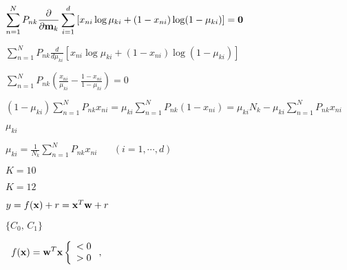 \documentclass{article}
\def\lthtmlcheckvsize{\ifdim\ht\sizebox<\vsize 
  \ifdim\wd\sizebox<\hsize\expandafter\hfill\fi \expandafter\vfill
  \else\expandafter\vss\fi}%
\begin{document}
{\newpage\clearpage
{}%
$\displaystyle \sum_{n=1}^N P_{nk} \frac{\partial}{\partial{\bf m}_k}
\sum_{i=1}^d\left[ x_{ni}\log\mu_{ki}+(1-x_{ni})\log(1-\mu_{ki}) \right]={\bf0}$%
\lthtmlindisplaymathZ
\lthtmlcheckvsize\clearpage}

{\newpage\clearpage
{}%
$\displaystyle \sum_{n=1}^N P_{nk}\frac{d}{d\mu_{ki}}
\left[ x_{ni}\log \mu_{ki}+(1-x_{ni})\log(1-\mu_{ki})\right]$%
\lthtmlindisplaymathZ
\lthtmlcheckvsize\clearpage}

{\newpage\clearpage
{}%
$\displaystyle \sum_{n=1}^N P_{nk}\left(\frac{x_{ni}}{\mu_{ki}}-\frac{1-x_{ni}}{1-\mu_{ki}}\right)=0$%
\lthtmlindisplaymathZ
\lthtmlcheckvsize\clearpage}

{\newpage\clearpage
{}%
$\displaystyle (1-\mu_{ki})\sum_{n=1}^N P_{nk} x_{ni}=\mu_{ki}\sum_{n=1}^N P_{nk}(1-x_{ni})
=\mu_{ki}N_k-\mu_{ki} \sum_{n=1}^N P_{nk}x_{ni}$%
\lthtmlindisplaymathZ
\lthtmlcheckvsize\clearpage}

{\newpage\clearpage
{}%
$ \mu_{ki}$%
\lthtmlindisplaymathZ
\lthtmlcheckvsize\clearpage}

{\newpage\clearpage
{}%
$\displaystyle \mu_{ki}=\frac{1}{N_k}\sum_{n=1}^N P_{nk}x_{ni}\;\;\;\;\;\;(i=1,\cdots,d)$%
\lthtmlindisplaymathZ
\lthtmlcheckvsize\clearpage}

{\newpage\clearpage
{}%
$ K=10$%
\lthtmlindisplaymathZ
\lthtmlcheckvsize\clearpage}

{\newpage\clearpage
{}%
$ K=12$%
\lthtmlindisplaymathZ
\lthtmlcheckvsize\clearpage}

{\newpage\clearpage
{}%
$ y=f({\bf x})+r={\bf x}^T{\bf w}+r$%
\lthtmlindisplaymathZ
\lthtmlcheckvsize\clearpage}

{\newpage\clearpage
{}%
$ \{C_0,\,C_1\}$%
\lthtmlindisplaymathZ
\lthtmlcheckvsize\clearpage}

{\newpage\clearpage
{}%
$\displaystyle \;\;f({\bf x})={\bf w}^T{\bf x}\left\{\begin{array}{l}<0\\>0
\end{array}\right.,\;\;\;\;\;\;\;$%
\lthtmlindisplaymathZ
\lthtmlcheckvsize\clearpage}
\end{document}
